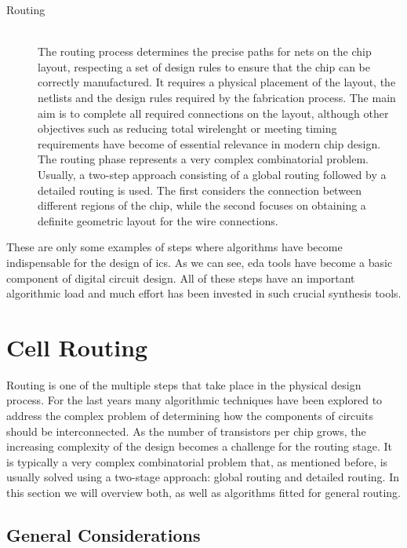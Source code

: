 \begin{description}
  \item[Routing] \hfill \\
  The routing process determines the precise paths for nets on the chip layout, respecting a set of design rules to ensure that the chip can be correctly manufactured. It requires a physical placement of the layout, the netlists and the design rules required by the fabrication process. The main aim is to complete all required connections on the layout, although other objectives such as reducing total wirelenght or meeting timing requirements have become of essential relevance in modern chip design. The routing phase represents a very complex combinatorial problem. Usually, a two-step approach consisting of a global routing followed by a detailed routing is used. The first considers the connection between different regions of the chip, while the second focuses on obtaining a definite geometric layout for the wire connections.
\end{description}

These are only some examples of steps where algorithms have become indispensable for the design of \glspl{ic}. As we can see, \gls{eda} tools have become a basic component of digital circuit design. All of these steps have an important algorithmic load and much effort has been invested in such crucial synthesis tools. \\


\section{Cell Routing}
\label{sec:routing}


Routing is one of the multiple steps that take place in the physical design process. For the last years many algorithmic techniques have been explored to address the complex problem of determining how the components of circuits should be interconnected. As the number of transistors per chip grows, the increasing complexity of the design becomes a challenge for the routing stage. It is typically a very complex combinatorial problem that, as mentioned before, is usually solved using a two-stage approach: global routing and detailed routing. In this section we will overview both, as well as algorithms fitted for general routing. \\

\subsection{General Considerations}

